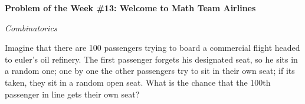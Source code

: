\begin{potw}\vspace{5pt}
{\large\textbf{Problem of the Week \#13: Welcome to Math Team Airlines}}\vspace{5pt}

\textit{Combinatorics}\V

Imagine that there are 100 passengers trying to board a commercial flight headed to euler’s oil refinery. The first passenger forgets his designated seat, so he sits in a random one; one by one the other passengers try to sit in their own seat; if its taken, they sit in a random open seat. What is the chance that the 100th passenger in line gets their own seat?
\end{potw}\V
